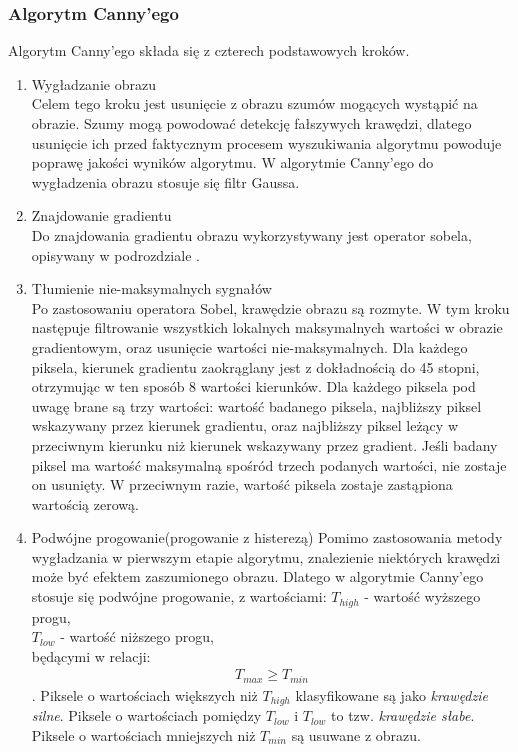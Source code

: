 \subsubsection{Algorytm Canny'ego}
Algorytm Canny'ego składa się z czterech podstawowych kroków.
\begin{enumerate}
\item Wygładzanie obrazu \\
  Celem tego kroku jest usunięcie z obrazu szumów mogących wystąpić na obrazie. Szumy mogą powodować detekcję fałszywych krawędzi, dlatego usunięcie ich przed faktycznym procesem wyszukiwania algorytmu powoduje poprawę jakości wyników algorytmu. W algorytmie Canny'ego do wygładzenia obrazu stosuje się filtr Gaussa. 
\item Znajdowanie gradientu \\
  Do znajdowania gradientu obrazu wykorzystywany jest operator sobela, opisywany w podrozdziale .
\item Tłumienie nie-maksymalnych sygnałów \\
  Po zastosowaniu operatora Sobel, krawędzie obrazu są rozmyte. W tym kroku następuje filtrowanie wszystkich lokalnych maksymalnych wartości w obrazie gradientowym, oraz usunięcie wartości nie-maksymalnych. Dla każdego piksela, kierunek gradientu zaokrąglany jest z dokładnością do 45 stopni, otrzymując w ten sposób 8 wartości kierunków. Dla każdego piksela pod uwagę brane są trzy wartości: wartość badanego piksela, najbliższy piksel wskazywany przez kierunek gradientu, oraz najbliższy piksel leżący w przeciwnym kierunku niż kierunek wskazywany przez gradient. Jeśli badany piksel ma wartość maksymalną spośród trzech podanych wartości, nie zostaje on usunięty. W przeciwnym razie, wartość piksela zostaje zastąpiona wartością zerową.
\item Podwójne progowanie(progowanie z histerezą)
  Pomimo zastosowania metody wygładzania w pierwszym etapie algorytmu, znalezienie niektórych krawędzi może być efektem zaszumionego obrazu. Dlatego w algorytmie Canny'ego stosuje się podwójne progowanie, z wartościami:
$T_{high}$ - wartość wyższego progu,\\
$T_{low}$ - wartość niższego progu,\\
będącymi w relacji:
\begin{gather*}
  T_{max} \geq T_{min} 
\end{gather*}.
Piksele o wartościach większych niż $T_{high}$ klasyfikowane są jako \textit{krawędzie silne}. Piksele o wartościach pomiędzy $T_{low}$ i $T_{low}$ to tzw. \textit{krawędzie słabe}. Piksele o wartościach mniejszych niż $T_{min}$ są usuwane z obrazu.

\end{enumerate}


